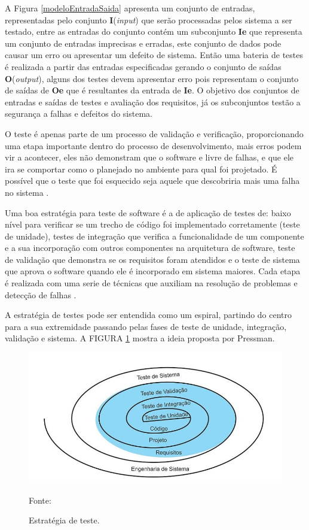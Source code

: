 A Figura \ref{modeloEntradaSaida} apresenta um conjunto de entradas, representadas pelo conjunto \textbf{I}(\textit{input}) que serão processadas pelos sistema a ser testado, entre as entradas do conjunto contém um subconjunto \textbf{Ie} que representa um conjunto de entradas imprecisas e erradas, este conjunto de dados pode causar um erro ou apresentar um defeito de sistema. Então uma bateria de testes é realizada a partir das entradas especificadas gerando o conjunto de saídas \textbf{O}(\textit{output}), alguns dos testes devem apresentar erro pois representam o conjunto de saídas de \textbf{Oe} que é resultantes da entrada de \textbf{Ie}. O objetivo dos conjuntos de entradas e saídas de testes e avaliação dos requisitos, já os subconjuntos testão a segurança a falhas e defeitos do sistema.

O teste é apenas parte de um processo de validação e verificação, proporcionando uma etapa importante dentro do processo de desenvolvimento, mais erros podem vir a acontecer, eles não demonstram que o software e livre de falhas, e que ele ira se comportar como o planejado no ambiente para qual foi projetado. É possível que o teste que foi esquecido seja aquele que descobriria mais uma falha no sistema \cite{SOMMER2011}.

Uma boa estratégia para teste de software é a de aplicação de testes de: baixo nível para verificar se um trecho de código foi implementado corretamente (teste de unidade), testes de integração que verifica a funcionalidade de um componente e a sua incorporação com outros componentes na arquitetura de software, teste de validação que demonstra se os requisitos foram atendidos e o teste de sistema que aprova o software quando ele é incorporado em sistema maiores. Cada etapa é realizada com uma serie de técnicas que auxiliam na resolução de problemas e detecção de falhas \cite{PRESMA2016}.

A estratégia de testes pode ser entendida como um espiral, partindo do centro para a sua extremidade passando pelas fases de teste de unidade, integração, validação e sistema. A FIGURA \ref{espiral} mostra a ideia proposta por Pressman.

\begin{figure}[h!]
	\centering
	\includegraphics[scale=0.6]{dados/figuras/espiralPres.JPG}
	\caption{Estratégia de teste.}
	Fonte: \cite[p.~470]{PRESMA2016}
	\label{espiral}
\end{figure}

